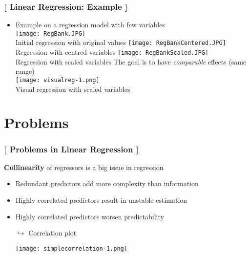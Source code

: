 \documentclass[xcolor=x11names,compress, handhouts]{beamer}
\renewcommand{\(}{\begin{columns}}
\renewcommand{\)}{\end{columns}}
\newcommand{\<}[1]{\begin{column}{#1}}
\renewcommand{\>}{\end{column}}
\begin{document}
\begin{frame} %
\frametitle{\textcolor{brique}{[ Linear Regression: Example ]}}
\pause
\begin{itemize}
\item Example on a regression model with few variables\\
   {\texttt{[image: RegBank.JPG]} \\ }
   {Initial regression with original values}
   { \texttt{[image: RegBankCentered.JPG]} \\ }
   {Regression with centred variables}
   {\texttt{[image: RegBankScaled.JPG]} \\ }
   {Regression with scaled variables}
   {The goal is to have \textit{comparable} effects (same range)\\ }
   {\texttt{[image: visualreg-1.png]} \\ }
   {Visual regression with scaled variables}
\end{itemize}
\end{frame}


\section{Problems}

\begin{frame} %
\frametitle{\textcolor{brique}{[ Problems in Linear Regression ]}}
\textbf{Collinearity } of regressors is a big issue in regression
\pause
\begin{itemize}[<+->]
  \item Redundant predictors add more complexity than information
  \item Highly correlated predictors result in unstable estimation
  \item Highly correlated predictors worsen predictability
  \item[$\hookrightarrow$] Correlation plot
  \item[] \texttt{[image: simplecorrelation-1.png]}
\end{itemize}
\end{frame}
\end{document}
